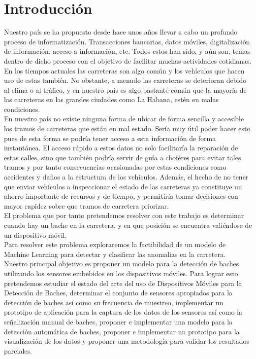 \chapter*{Introducción}\label{chapter:introduction}

Nuestro país se ha propuesto desde hace unos años llevar a cabo un profundo proceso de informatización.
Transacciones bancarias, datos móviles, digitalización de información, acceso a información, etc. Todos
estos han sido, y aún son, temas dentro de dicho proceso con el objetivo de facilitar muchas actividades
cotidianas. En los tiempos actuales las carreteras son algo común y los vehículos que hacen uso de estas
también. No obstante, a menudo las carreteras se deterioran debido al clima o al tráfico, y en nuestro
país es algo bastante común que la mayoría de las carreteras en las grandes ciudades como La Habana, estén
en malas condiciones.\\ En nuestro país no existe ninguna forma de ubicar de forma sencilla y accesible los
tramos de carreteras que están en mal estado. Sería muy útil poder hacer esto pues de esta forma se podría
tener acceso a esta información de forma instantánea. El acceso rápido a estos datos no solo facilitaría la
reparación de estas calles, sino que también podría servir de guía a choféres para evitar tales tramos y por
tanto consecuencias ocasionadas por estas condiciones como accidentes y daños a la estructura de los vehículos.
Además, el hecho de no tener que enviar vehículos a inspeccionar el estado de las carreteras ya constituye un
ahorro importante de recursos y de tiempo, y permitiría tomar decisiones con mayor rapidez sobre que tramos de
carretera priorizar.\\ El problema que por tanto pretendemos resolver con este trabajo es determinar cuando hay
un bache en la carretera, y en que posición se encuentra valiéndose de un dispositivo móvil.\\
Para resolver este problema exploraremos la factibilidad de un modelo de Machine Learning para detectar y clasificar 
las anomalias en la carretera.\\
Nuestro principal objetivo es proponer un modelo para la detección de baches utilizando los sensores embebidos en los
dispositivos móviles. Para lograr esto pretendemos estudiar el estado del arte del uso de Dispositivos Móviles para
la Detección de Baches, determinar el conjunto de sensores apropiados para la detección de baches así como su
frecuencia de muestreo, implementar un prototipo de aplicación para la captura de los datos de los sensores así 
como la señalización manual de baches, proponer e implementar una modelo para la detección automática de baches,
proponer e implementar un prototipo para la visualización de los datos y proponer una metodología para validar los
resultados parciales.

